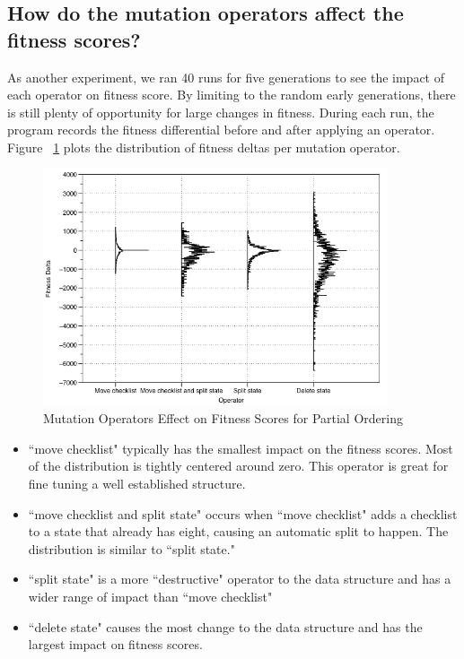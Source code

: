 \documentclass[preprint,12pt,3p]{elsarticle}
\begin{document}
\subsection{How do the mutation operators affect the fitness scores?}
As another experiment, we ran 40 runs for five generations to see the impact of each operator on fitness score. By limiting to the random early generations, there is still plenty of opportunity for large changes in fitness. During each run, the program records the fitness differential before and after applying an operator. Figure ~\ref{OperatorsPartialOrdering} plots the distribution of fitness deltas per mutation operator.

\begin{figure}[ht]
\includegraphics[width=4.0in]{images/operator_analysis_partial_order_first_5_gens}
\caption{Mutation Operators Effect on Fitness Scores for Partial Ordering}
\label{OperatorsPartialOrdering}
\end{figure}

\begin{itemize}
  \item ``move checklist" typically has the smallest impact on the fitness scores. Most of the distribution is tightly centered around zero. This operator is great for fine tuning a well established structure. 
  \item ``move checklist and split state" occurs when ``move checklist" adds a  checklist to a state that already has eight, causing an automatic split to happen. The distribution is similar to ``split state."
  \item ``split state" is a more ``destructive" operator to the data structure and has a wider range of impact than ``move checklist"
  \item ``delete state" causes the most change to the data structure and has the largest impact on fitness scores. 
\end{itemize}
\end{document}
